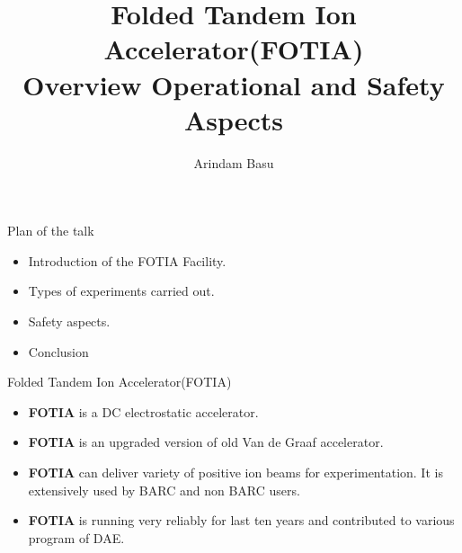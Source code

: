 \documentclass[11pt]{beamer}
\author{Arindam Basu}
\title{Folded Tandem Ion Accelerator(FOTIA)\\ Overview Operational and Safety Aspects}
\begin{document}
\begin{frame}
\titlepage
\end{frame}



\begin{frame}{Plan of the talk}

\begin{itemize}
\item Introduction of the FOTIA Facility.
\item Types of experiments carried out.
\item Safety aspects.
\item Conclusion



\end{itemize}

\end{frame}





\begin{frame}{Folded Tandem Ion Accelerator(FOTIA)}

\begin{itemize}
\item \textbf{FOTIA} is a DC electrostatic accelerator.
\item \textbf{FOTIA} is an upgraded version of old Van de Graaf accelerator.
\item \textbf{FOTIA} can deliver variety of positive ion beams for experimentation. It is extensively used by BARC and non BARC users.

\item \textbf{FOTIA} is running very reliably for last ten years and contributed to various program of DAE.
 
 


\end{itemize}

\end{frame}
\end{document}
